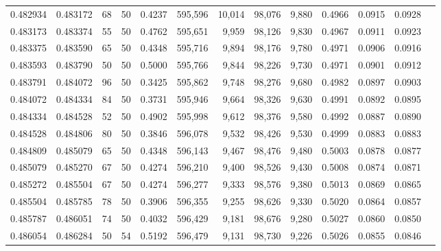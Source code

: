 \begin{tabular}{rrrrrrrrrrrrr}
0.482934 & 0.483172 &    68 &  50 &                                     0.4237 & 595,596 &  10,014 &  98,076 &   9,880 & 0.4966 & 0.0915 & 0.0928 \\
0.483173 & 0.483374 &    55 &  50 &                                     0.4762 & 595,651 &   9,959 &  98,126 &   9,830 & 0.4967 & 0.0911 & 0.0923 \\
0.483375 & 0.483590 &    65 &  50 &                                     0.4348 & 595,716 &   9,894 &  98,176 &   9,780 & 0.4971 & 0.0906 & 0.0916 \\
0.483593 & 0.483790 &    50 &  50 &                                     0.5000 & 595,766 &   9,844 &  98,226 &   9,730 & 0.4971 & 0.0901 & 0.0912 \\
0.483791 & 0.484072 &    96 &  50 &                                     0.3425 & 595,862 &   9,748 &  98,276 &   9,680 & 0.4982 & 0.0897 & 0.0903 \\
0.484072 & 0.484334 &    84 &  50 &                                     0.3731 & 595,946 &   9,664 &  98,326 &   9,630 & 0.4991 & 0.0892 & 0.0895 \\
0.484334 & 0.484528 &    52 &  50 &                                     0.4902 & 595,998 &   9,612 &  98,376 &   9,580 & 0.4992 & 0.0887 & 0.0890 \\
0.484528 & 0.484806 &    80 &  50 &                                     0.3846 & 596,078 &   9,532 &  98,426 &   9,530 & 0.4999 & 0.0883 & 0.0883 \\
0.484809 & 0.485079 &    65 &  50 &                                     0.4348 & 596,143 &   9,467 &  98,476 &   9,480 & 0.5003 & 0.0878 & 0.0877 \\
0.485079 & 0.485270 &    67 &  50 &                                     0.4274 & 596,210 &   9,400 &  98,526 &   9,430 & 0.5008 & 0.0874 & 0.0871 \\
0.485272 & 0.485504 &    67 &  50 &                                     0.4274 & 596,277 &   9,333 &  98,576 &   9,380 & 0.5013 & 0.0869 & 0.0865 \\
0.485504 & 0.485785 &    78 &  50 &                                     0.3906 & 596,355 &   9,255 &  98,626 &   9,330 & 0.5020 & 0.0864 & 0.0857 \\
0.485787 & 0.486051 &    74 &  50 &                                     0.4032 & 596,429 &   9,181 &  98,676 &   9,280 & 0.5027 & 0.0860 & 0.0850 \\
0.486054 & 0.486284 &    50 &  54 &                                     0.5192 & 596,479 &   9,131 &  98,730 &   9,226 & 0.5026 & 0.0855 & 0.0846 \\

\end{tabular}
